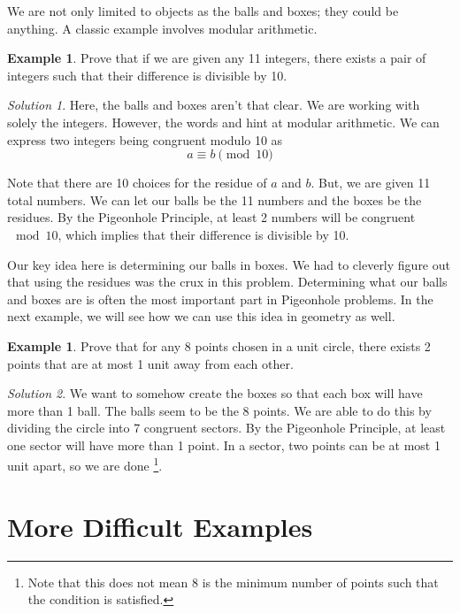 \documentclass[l1pt]{article}
\theoremstyle{plain}
\theoremstyle{definition}
\newtheorem{example}[thm]{Example}
\theoremstyle{remark}
\newtheorem*{solution}{Solution}
\begin{document}
\bigskip

We are not only limited to objects as the balls and boxes; they could be anything. A classic example involves modular arithmetic.

\begin{example}
Prove that if we are given any 11 integers, there exists a pair of integers such that their difference is divisible by 10.
\end{example}

\begin{solution}
Here, the balls and boxes aren't that clear. We are working with solely the integers. However, the words  and  hint at modular arithmetic. We can express two integers being congruent modulo 10 as \[a \equiv b \pmod {10}\]

Note that there are 10 choices for the residue of $a$ and $b$. But, we are given 11 total numbers. We can let our balls be the 11 numbers and the boxes be the residues. By the Pigeonhole Principle, at least 2 numbers will be congruent $\mod 10$, which implies that their difference is divisible by 10.
\end{solution}

\bigskip

Our key idea here is determining our balls in boxes. We had to cleverly figure out that using the residues was the crux in this problem. Determining what our balls and boxes are is often the most important part in Pigeonhole problems. In the next example, we will see how we can use this idea in geometry as well.

\begin{example}
Prove that for any 8 points chosen in a unit circle, there exists 2 points that are at most 1 unit away from each other.
\end{example}

\begin{solution}
We want to somehow create the boxes so that each box will have more than 1 ball. The balls seem to be the 8 points. We are able to do this by dividing the circle into 7 congruent sectors. By the Pigeonhole Principle, at least one sector will have more than 1 point. In a sector, two points can be at most 1 unit apart, so we are done \footnote{Note that this does not mean 8 is the minimum number of points such that the condition is satisfied.}.
\end{solution}

\section{More Difficult Examples}
\end{document}
